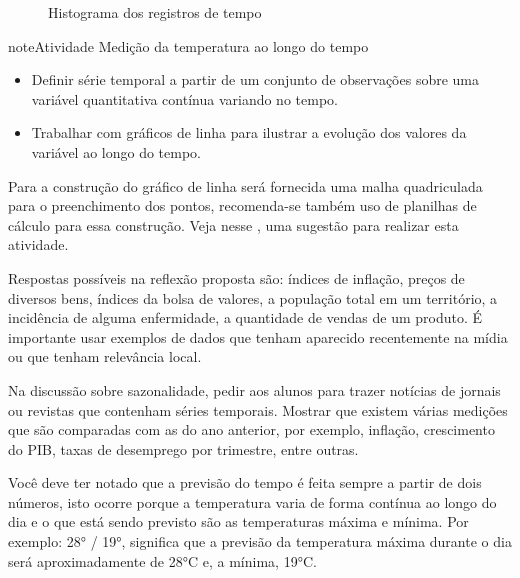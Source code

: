 \begin{figure}[H]
\centering
\capstart

\noindent{}
\caption{Histograma dos registros de tempo}\label{\detokenize{PE103-3:fig-histograma-resposta}}\label{\detokenize{PE103-3:id3}}\end{figure}
\label{\detokenize{PE103-3:ativ-medicao-temperatura-serie-temporal}}
\begin{sphinxadmonition}{note}{Atividade}{ Medição da temperatura ao longo do tempo}

\begin{itemize}
\item {} 
Definir série temporal a partir de um conjunto de observações sobre uma variável quantitativa contínua variando no tempo.

\item {} 
Trabalhar com  gráficos de linha para ilustrar a evolução dos valores da variável ao longo do tempo.

\end{itemize}


Para a construção do gráfico de linha será fornecida uma malha quadriculada para o preenchimento dos pontos, recomenda-se também uso de planilhas de cálculo para essa construção. Veja nesse , uma sugestão para realizar esta atividade.

Respostas possíveis na reflexão proposta são: índices de inflação, preços de diversos bens,  índices da bolsa de valores, a população total em um território, a incidência de alguma enfermidade, a quantidade de vendas de um produto. É importante usar exemplos de dados que tenham aparecido recentemente na mídia ou que tenham relevância local.

Na discussão sobre sazonalidade, pedir aos alunos para trazer notícias de jornais ou revistas que contenham séries temporais. Mostrar que existem várias medições que são comparadas com as do ano anterior, por exemplo, inflação, crescimento do PIB, taxas de desemprego por trimestre, entre outras.

Você deve ter notado que a previsão do tempo é feita sempre a partir de dois números, isto ocorre porque a temperatura varia de forma contínua ao longo do dia e o que está sendo previsto são as temperaturas máxima e mínima. Por exemplo: 28° / 19°, significa que a previsão da temperatura máxima durante o dia será aproximadamente de 28°C e, a mínima, 19°C.


\end{sphinxadmonition}
